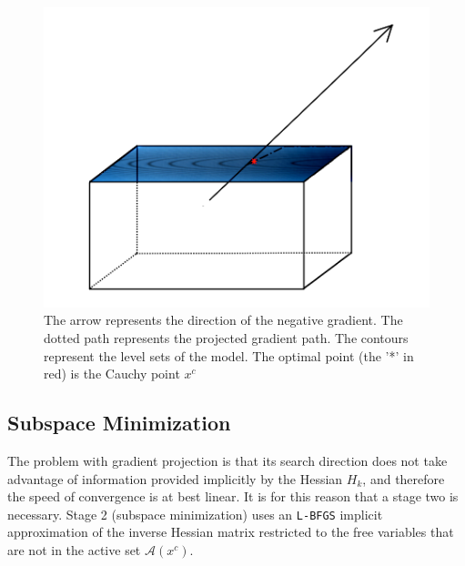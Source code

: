 \begin{figure}
\begin{center}
\includegraphics[scale=0.4]{Figures/cajapresentation3.png}
\caption[Graphical Representation of Gradient Projection]{The arrow represents the direction of the negative gradient. The dotted path represents the projected gradient path. The contours represent the level sets of the model. The optimal point (the '*' in red) is the Cauchy point $x^c$}
\label{caja}
\end{center}
\end{figure}

\subsection{Subspace Minimization}

The problem with gradient projection is that its search direction does not take advantage of information provided implicitly by the Hessian $H_k$, and therefore the speed of convergence is at best linear. It is for this reason that a stage two is necessary. Stage 2 (subspace minimization) uses an \texttt{L-BFGS} implicit approximation of the inverse Hessian matrix restricted to the free variables that are not in the active set $\mathcal{A}(x^c)$.

